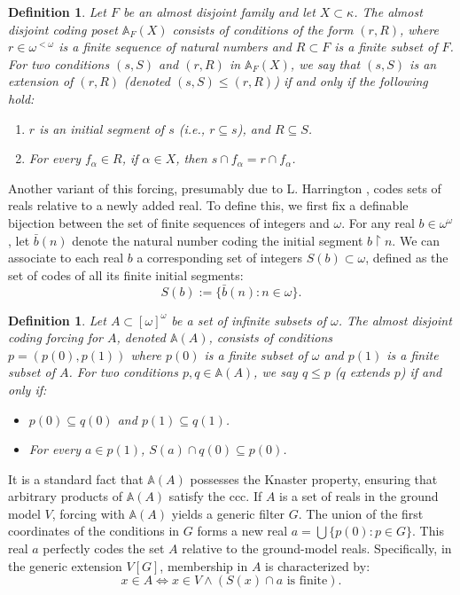 \documentclass[a4paper,11pt]{article}
\newtheorem{definition}[theorem]{Definition}
\begin{document}
\begin{definition}
Let $F$ be an almost disjoint family and let $X \subset \kappa$. The almost disjoint coding poset $\mathbb{A}_F(X)$ consists of conditions of the form $(r, R)$, where $r \in \omega^{<\omega}$ is a finite sequence of natural numbers and $R \subset F$ is a finite subset of $F$. 
For two conditions $(s, S)$ and $(r, R)$ in $\mathbb{A}_F(X)$, we say that $(s, S)$ is an extension of $(r, R)$ (denoted $(s, S) \le (r, R)$) if and only if the following hold:
\begin{enumerate}
    \item $r$ is an initial segment of $s$ (i.e., $r \subseteq s$), and $R \subseteq S$.
    \item For every $f_{\alpha} \in R$, if $\alpha \in X$, then $s \cap f_{\alpha} = r \cap f_{\alpha}$.
\end{enumerate}
\end{definition}

Another variant of this forcing, presumably due to L. Harrington \cite{Harrington}, codes sets of reals relative to a newly added real. To define this, we first fix a definable bijection between the set of finite sequences of integers and $\omega$. For any real $b \in \omega^{\omega}$, let $\bar{b}(n)$ denote the natural number coding the initial segment $b \upharpoonright n$. We can associate to each real $b$ a corresponding set of integers $S(b) \subset \omega$, defined as the set of codes of all its finite initial segments:
$$S(b) := \{ \bar{b}(n) : n \in \omega \}.$$

\begin{definition}
Let $A \subset [\omega]^{\omega}$ be a set of infinite subsets of $\omega$. The almost disjoint coding forcing for $A$, denoted $\mathbb{A}(A)$, consists of conditions $p = (p(0), p(1))$ where $p(0)$ is a finite subset of $\omega$ and $p(1)$ is a finite subset of $A$. 
For two conditions $p, q \in \mathbb{A}(A)$, we say $q \le p$ ($q$ extends $p$) if and only if:
\begin{itemize}
    \item $p(0) \subseteq q(0)$ and $p(1) \subseteq q(1)$.
    \item For every $a \in p(1)$, $S(a) \cap q(0) \subseteq p(0)$.
\end{itemize}
\end{definition}

It is a standard fact that $\mathbb{A}(A)$ possesses the Knaster property, ensuring that arbitrary products of $\mathbb{A}(A)$ satisfy the ccc. If $A$ is a set of reals in the ground model $V$, forcing with $\mathbb{A}(A)$ yields a generic filter $G$. The union of the first coordinates of the conditions in $G$ forms a new real $a = \bigcup \{ p(0) : p \in G \}$. This real $a$ perfectly codes the set $A$ relative to the ground-model reals. Specifically, in the generic extension $V[G]$, membership in $A$ is characterized by:
$$x \in A \iff x \in V \land (S(x) \cap a \text{ is finite}).$$
\end{document}
